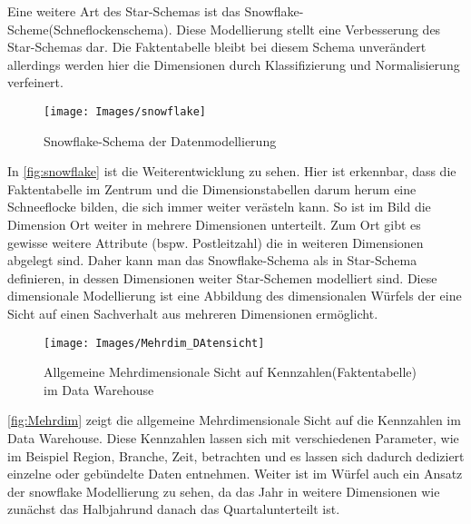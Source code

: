 Eine weitere Art des Star-Schemas ist das \glqq Snowflake-Scheme\grqq (Schneflockenschema). Diese Modellierung stellt eine Verbesserung des Star-Schemas dar. Die Faktentabelle bleibt bei diesem Schema unverändert allerdings werden hier die Dimensionen durch Klassifizierung und Normalisierung verfeinert.
\begin{figure}[H]
	\begin{center}
		\texttt{[image: Images/snowflake]}
		\caption{Snowflake-Schema der Datenmodellierung\cite{Wikipedia:Snowflake}}
		\label{fig:snowflake}
	\end{center}
\end{figure}
In \autoref{fig:snowflake} ist die Weiterentwicklung zu sehen. Hier ist erkennbar, dass die Faktentabelle im Zentrum und die Dimensionstabellen darum herum eine Schneeflocke bilden, die sich immer weiter verästeln kann. So ist im Bild die Dimension Ort weiter in mehrere Dimensionen unterteilt. Zum Ort gibt es gewisse weitere Attribute (bspw. Postleitzahl) die in weiteren Dimensionen abgelegt sind. Daher kann man das Snowflake-Schema als in Star-Schema definieren, in dessen Dimensionen weiter Star-Schemen modelliert sind.\cite{tecchanel:snowflake}
Diese dimensionale Modellierung ist eine Abbildung des dimensionalen Würfels der eine Sicht auf einen Sachverhalt aus mehreren Dimensionen ermöglicht.
\begin{figure}[H]
	\begin{center}
		\texttt{[image: Images/Mehrdim\_DAtensicht]}
		\caption{Allgemeine Mehrdimensionale Sicht auf Kennzahlen(Faktentabelle) im Data Warehouse}
		\label{fig:Mehrdim}
	\end{center}
\end{figure}
\autoref{fig:Mehrdim} zeigt die allgemeine Mehrdimensionale Sicht auf die Kennzahlen im Data Warehouse. Diese Kennzahlen lassen sich mit verschiedenen Parameter, wie im Beispiel Region, Branche, Zeit, betrachten und es lassen sich dadurch dediziert einzelne oder gebündelte Daten entnehmen. Weiter ist im Würfel auch ein Ansatz der snowflake Modellierung zu sehen, da das Jahr \grqq in weitere Dimensionen wie zunächst das \glqq Halbjahr\grqq und danach das \glqq Quartal\grqq unterteilt ist.
\cite{Astera:Kimmball_Inmon}\cite{ITEW:Patrik_02.05}\cite{ITEW:DataWarehouse}
